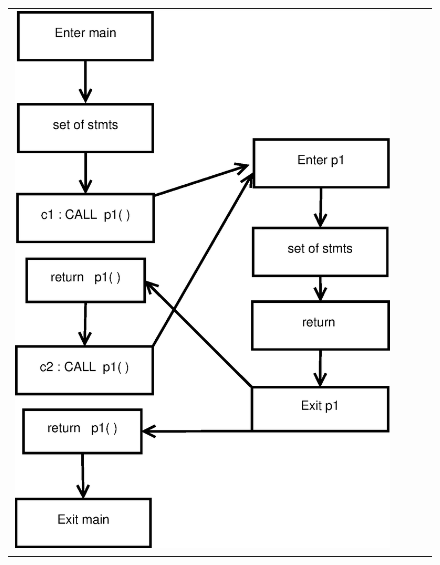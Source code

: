 \begin{figure}[h]
 
\begin{tabular}{c  c}
\includegraphics[scale=.4]{diagrams/Diagram1.eps} 
& \   \   \

\end{tabular}
\end{figure}
